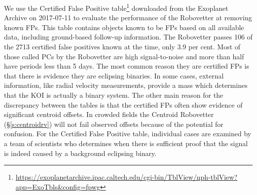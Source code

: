 We use the Certified False Positive table\footnote{\url{https://exoplanetarchive.ipac.caltech.edu/cgi-bin/TblView/nph-tblView?app=ExoTbls\&config=fpwg}} downloaded from the Exoplanet Archive on 2017-07-11 to evaluate the performance of the Robovetter at removing known FPs. This table contains objects known to be FPs based on all available data, including ground-based follow-up information.  The Robovetter passes 106 of the 2713 certified false positives known at the time, only 3.9 per cent.  Most of those called PCs by the Robovetter are high signal-to-noise and more than half have periods less than 5 days.  The most common reason they are certified FPs is that there is evidence they are eclipsing binaries. In some cases, external information, like radial velocity measurements, provide a mass which determines that the KOI is actually a binary system. The other main reason for the discrepancy between the tables is that the certified FPs often show evidence of significant centroid offsets. In crowded fields the Centroid Robovetter (\S\ref{s:centroidrv}) will not fail observed offsets because of the potential for confusion. For the Certified False Positive table, individual cases are examined by a team of scientists who determines when there is sufficient proof that the signal is indeed caused by a background eclipsing binary.  

